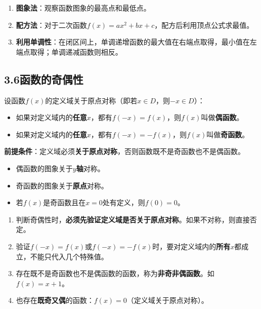 \documentclass[12pt, a4paper]{ctexart}
\begin{document}
\begin{tipbox}[求最值的常用方法]
\begin{enumerate}[leftmargin=2em]
  \item \textbf{图象法}：观察函数图象的最高点和最低点。
  \item \textbf{配方法}：对于二次函数$f(x)=ax^2+bx+c$，配方后利用顶点公式求最值。
  \item \textbf{利用单调性}：在闭区间上，单调递增函数的最大值在右端点取得，最小值在左端点取得；单调递减函数则相反。
\end{enumerate}
\end{tipbox}

\subsection*{3.6\quad 函数的奇偶性}

\begin{knowledgebox}[奇函数与偶函数的定义]
设函数$f(x)$的定义域关于原点对称（即若$x\in D$，则$-x\in D$）：
\begin{itemize}[leftmargin=2em]
  \item 如果对定义域内的\textbf{任意}$x$，都有$f(-x) = f(x)$，则$f(x)$叫做\textbf{偶函数}。
  \item 如果对定义域内的\textbf{任意}$x$，都有$f(-x) = -f(x)$，则$f(x)$叫做\textbf{奇函数}。
\end{itemize}
\textbf{前提条件}：定义域必须\textbf{关于原点对称}，否则函数既不是奇函数也不是偶函数。
\end{knowledgebox}

\begin{knowledgebox}[奇偶性与图象的对称性]
\begin{itemize}[leftmargin=2em]
  \item 偶函数的图象关于\textbf{$y$轴}对称。
  \item 奇函数的图象关于\textbf{原点}对称。
  \item 若$f(x)$是奇函数且在$x=0$处有定义，则$f(0)=0$。
\end{itemize}
\end{knowledgebox}

\begin{warnbox}[易错提醒]
\begin{enumerate}[leftmargin=2em]
  \item 判断奇偶性时，\textbf{必须先验证定义域是否关于原点对称}。如果不对称，则直接否定。
  \item 验证$f(-x)=f(x)$或$f(-x)=-f(x)$时，要对定义域内的\textbf{所有}$x$都成立，不能只代入几个特殊值。
  \item 存在既不是奇函数也不是偶函数的函数，称为\textbf{非奇非偶函数}。如$f(x)=x+1$。
  \item 也存在\textbf{既奇又偶}的函数：$f(x)=0$（定义域关于原点对称）。
\end{enumerate}
\end{warnbox}
\end{document}

